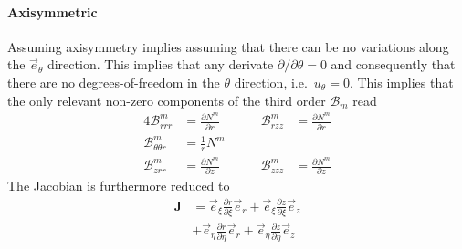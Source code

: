 \documentclass[times,namecite]{goose-article}
\begin{document}
\paragraph{Axisymmetric}

Assuming axisymmetry implies assuming that there can be no variations along the $\vec{e}_\theta$ direction. This implies that any derivate $\partial / \partial \theta = 0$ and consequently that there are no degrees-of-freedom in the $\theta$ direction, i.e.\ $u_\theta = 0$. This implies that the only relevant non-zero components of the third order $\mathcal{B}_m$ read
\begin{alignat}{4}
  \mathcal{B}^{m}_{r      r      r     } &= \frac{\partial N^m}{\partial r} & \qquad
  \mathcal{B}^{m}_{r      z      z     } &= \frac{\partial N^m}{\partial r}
  \nonumber
  \\
  \mathcal{B}^{m}_{\theta \theta r     } &= \frac{1}{r} N^m
  \nonumber
  \\
  \mathcal{B}^{m}_{z      r      r     } &= \frac{\partial N^m}{\partial z} & \qquad
  \mathcal{B}^{m}_{z      z      z     } &= \frac{\partial N^m}{\partial z}
\end{alignat}
The Jacobian is furthermore reduced to
\begin{align}
  \bm{J}
  &=
  \vec{e}_\xi    \frac{\partial r     }{\partial \xi } \vec{e}_r +
  \vec{e}_\xi    \frac{\partial z     }{\partial \xi } \vec{e}_z
  \nonumber
  \\
  &+
  \vec{e}_\eta   \frac{\partial r     }{\partial \eta} \vec{e}_r +
  \vec{e}_\eta   \frac{\partial z     }{\partial \eta} \vec{e}_z
\end{align}

% 
\end{document}
